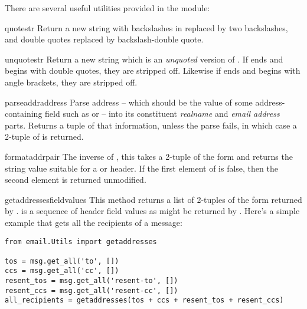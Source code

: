 
There are several useful utilities provided in the 
module:

\begin{funcdesc}{quote}{str}
Return a new string with backslashes in  replaced by two
backslashes, and double quotes replaced by backslash-double quote.
\end{funcdesc}

\begin{funcdesc}{unquote}{str}
Return a new string which is an \emph{unquoted} version of .
If  ends and begins with double quotes, they are stripped
off.  Likewise if  ends and begins with angle brackets, they
are stripped off.
\end{funcdesc}

\begin{funcdesc}{parseaddr}{address}
Parse address -- which should be the value of some address-containing
field such as  or  -- into its constituent
\emph{realname} and \emph{email address} parts.  Returns a tuple of that
information, unless the parse fails, in which case a 2-tuple of
 is returned.
\end{funcdesc}

\begin{funcdesc}{formataddr}{pair}
The inverse of , this takes a 2-tuple of the form
 and returns the string value suitable
for a  or  header.  If the first element of
 is false, then the second element is returned unmodified.
\end{funcdesc}

\begin{funcdesc}{getaddresses}{fieldvalues}
This method returns a list of 2-tuples of the form returned by
.   is a sequence of header field
values as might be returned by .  Here's a
simple example that gets all the recipients of a message:

\begin{verbatim}
from email.Utils import getaddresses

tos = msg.get_all('to', [])
ccs = msg.get_all('cc', [])
resent_tos = msg.get_all('resent-to', [])
resent_ccs = msg.get_all('resent-cc', [])
all_recipients = getaddresses(tos + ccs + resent_tos + resent_ccs)
\end{verbatim}
\end{funcdesc}

